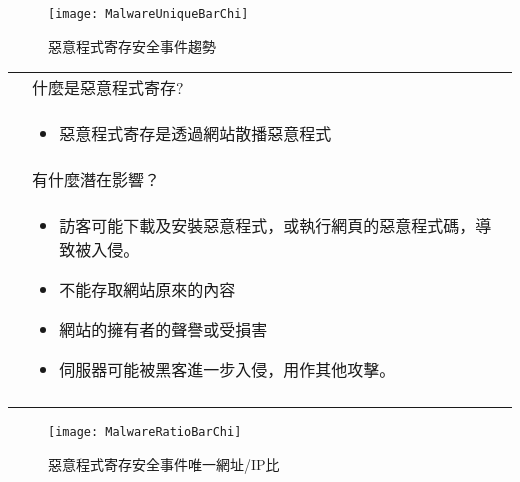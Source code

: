 \documentclass[14pt]{extarticle}
\begin{document}
\begin{figure}[h!]
\centerline{\texttt{[image: MalwareUniqueBarChi]}}
\caption{惡意程式寄存安全事件趨勢}
\end{figure}
\begin{table}[h!]
    \small
     \begin{center}
     \begin{tabular}{ c p{14cm} }
     \toprule
     \multirow{4}{*}{\raisebox{-\totalheight}{\texttt{[image: lightbulb]}}} & 什麼是惡意程式寄存? \\\cline{2-2} 
                            & \begin{itemize}[topsep=0pt]
                                  \item 惡意程式寄存是透過網站散播惡意程式
                              \end{itemize} \\\cline{2-2}
                            & 有什麼潛在影響？ \\\cline{2-2} 
                            & \begin{itemize}[topsep=0pt]
                                  \item 訪客可能下載及安裝惡意程式，或執行網頁的惡意程式碼，導致被入侵。
                                  \item 不能存取網站原來的內容
                                  \item 網站的擁有者的聲譽或受損害
                                  \item 伺服器可能被黑客進一步入侵，用作其他攻擊。
                             \end{itemize} \\
      \\\bottomrule
      \end{tabular}
      \end{center}    
\end{table}

\newpage
\FloatBarrier

\begin{figure}[h!]
\centerline{\texttt{[image: MalwareRatioBarChi]}}
\caption{惡意程式寄存安全事件唯一網址/IP比}
\end{figure}
\end{document}
